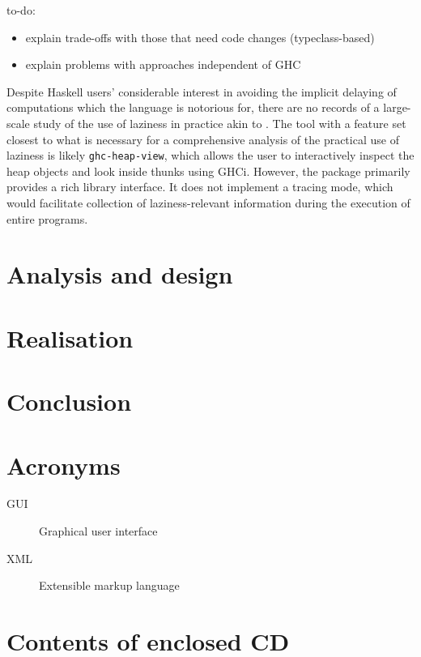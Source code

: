 \documentclass[thesis=B,english]{FITthesis}[2019/12/23]
\begin{document}
to-do:
\begin{itemize}
	\item explain trade-offs with those that need code changes (typeclass-based)
	\item explain problems with approaches independent of GHC
\end{itemize}

Despite Haskell users' considerable interest in avoiding the implicit delaying
of computations which the language is notorious for, there are no records of a
large-scale study of the use of laziness in practice akin to
\cite{emp-study-laziness-r}. The tool with a feature set closest to what is
necessary for a comprehensive analysis of the practical use of laziness is
likely \texttt{ghc-heap-view}, which allows the user to interactively inspect
the heap objects and look inside thunks using GHCi. However, the package
primarily provides a rich library interface. It does not implement a tracing
mode, which would facilitate collection of laziness-relevant information during
the execution of entire programs.

\chapter{Analysis and design}

\chapter{Realisation}

\chapter{Conclusion}





\appendix

\chapter{Acronyms}
\begin{description}
	\item[GUI] Graphical user interface
	\item[XML] Extensible markup language
\end{description}


\chapter{Contents of enclosed CD}


\begin{figure}
\end{figure}
\end{document}
